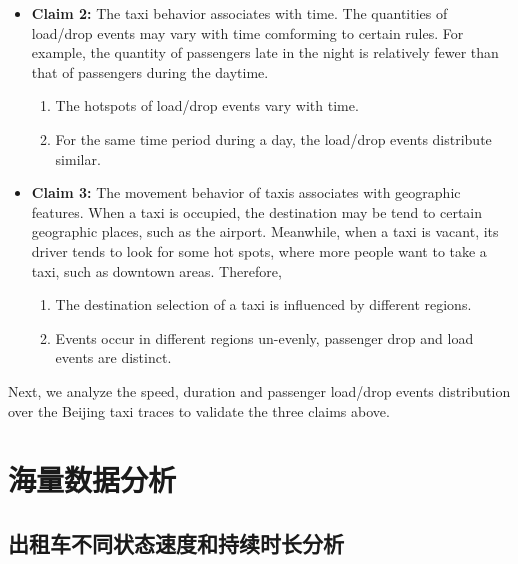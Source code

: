 \begin{itemize}
 \item \textbf{Claim 2:} The taxi behavior associates with time. The quantities of load/drop events may vary with time comforming to certain rules. For example, the quantity of passengers late in the night is relatively fewer than that of passengers during the daytime. 
      \begin{enumerate}
        \item The hotspots of load/drop events vary with time.
        \item For the same time period during a day, the load/drop events distribute similar.
      \end{enumerate}
  \item \textbf{Claim 3:} The movement behavior of taxis associates with geographic features. When a taxi is occupied, the destination may be tend to certain geographic places, such as the airport. Meanwhile, when a taxi is vacant, its driver tends to look for some hot spots, where more people want to take a taxi, such as downtown areas. Therefore,
      \begin{enumerate}
        \item The destination selection of a taxi is influenced by different regions.
        \item Events occur in different regions un-evenly, passenger drop and load events are distinct.
      \end{enumerate}
\end{itemize}
Next, we analyze the speed, duration and passenger load/drop events distribution over the Beijing taxi traces to validate the three claims above.

\section{海量数据分析}
\subsection{出租车不同状态速度和持续时长分析}

